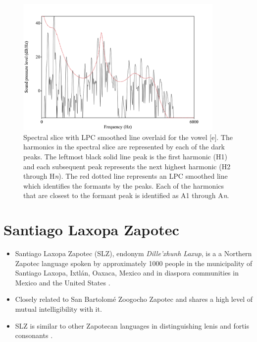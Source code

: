 \documentclass[12pt, letterpaper]{article}
\begin{document}
\begin{figure}[!h]
	\centering
	\includegraphics[width=0.9\textwidth]{../Harmonics.png}
	\caption{Spectral slice with LPC smoothed line overlaid for the vowel [e]. The harmonics in the spectral slice are represented by each of the dark peaks. The leftmost black solid line peak is the first harmonic (H1) and each subsequent peak represents the next highest harmonic (H2 through H\textit{n}). The red dotted line represents an LPC smoothed line which identifies the formants by the peaks. Each of the harmonics that are closest to the formant peak is identified as A1 through A\textit{n}.}
	\label{fig:Harmonics}
\end{figure}
\section{Santiago Laxopa Zapotec} \label{sec:SLZ}

\begin{itemize}
    \item Santiago Laxopa Zapotec (SLZ), endonym \textit{Dille'xhunh Laxup}, is a a Northern Zapotec language spoken by approximately 1000 people in the municipality of Santiago Laxopa, Ixtlán, Oaxaca, Mexico and in diaspora communities in Mexico and the United States \citep{adlerAcousticsPhonationTypes2016,adlerDerivationVerbInitiality2018,foleyForbiddenCliticClusters2018,foleyExtendingPersonCaseConstraint2020}.
    \item Closely related to San Bartolomé Zoogocho Zapotec \citep{longDiccionarioZapotecoSan2005,sonnenscheinDescriptiveGrammarSan2005} and shares a high level of mutual intelligibility with it.
    \item SLZ is similar to other Zapotecan languages in distinguishing lenis and fortis consonants \citep[e.g.,][]{nellisFortisLenisCajonos1980,jaegerFortisLenisQuestion1983,uchiharaFortisLenisGlides2016}.
\end{itemize}
\end{document}
